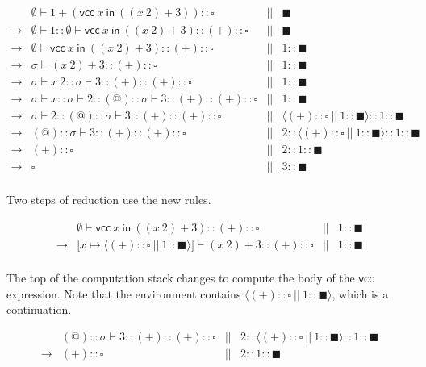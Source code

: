 \[
\begin{array}{lrcr}
& \emptyset\vdash 1+(\textsf{vcc}\ x\ \textsf{in}\ ((x\ 2)+3))::\square &||&
\blacksquare \\
\rightarrow & \emptyset\vdash 1::\emptyset\vdash \textsf{vcc}\ x\ \textsf{in}\
((x\ 2)+3)::(+)::\square &||& \blacksquare \\
\rightarrow & \emptyset\vdash \textsf{vcc}\ x\ \textsf{in}\ ((x\
2)+3)::(+)::\square &||& 1::\blacksquare \\
\rightarrow & \sigma\vdash (x\ 2)+3::(+)::\square &||& 1::\blacksquare \\
\rightarrow & \sigma\vdash x\ 2::\sigma\vdash 3::(+)::(+)::\square &||&
1::\blacksquare \\
\rightarrow & \sigma\vdash x::\sigma\vdash 2::(@)::\sigma\vdash
3::(+)::(+)::\square &||& 1::\blacksquare \\
\rightarrow & \sigma\vdash 2::(@)::\sigma\vdash 3::(+)::(+)::\square &||&
\langle(+)::\square \ ||\  1::\blacksquare\rangle:: 1::           \blacksquare \\
\rightarrow & (@)::\sigma\vdash 3::(+)::(+)::\square &||& 2::\langle(+)::\square
\ ||\  1::\blacksquare\rangle::1::           \blacksquare \\
\rightarrow & (+)::\square &||& 2::1::\blacksquare \\
\rightarrow & \square &||& 3::\blacksquare \\
\end{array}
\]

Two steps of reduction use the new rules.

\[\begin{array}{lrcr}
& \emptyset\vdash \textsf{vcc}\ x\ \textsf{in}\ ((x\ 2)+3)::(+)::\square &||&
1::\blacksquare \\
\rightarrow & \lbrack x\mapsto\langle(+)::\square\ ||\
1::\blacksquare\rangle\rbrack\vdash (x\ 2)+3::(+)::\square &||& 1::
\blacksquare \\
\end{array}\]

The top of the computation stack changes to compute the body of the
$\textsf{vcc}$ expression. Note that the environment contains
$\langle(+)::\square\ ||\ 1::\blacksquare\rangle$, which is a continuation.

\[\begin{array}{lrcr}
&(@)::\sigma\vdash 3::(+)::(+)::\square &||& 2::\langle(+)::\square \ ||\
1::\blacksquare\rangle::1::\blacksquare \\
\rightarrow & (+)::\square &||& 2::1::\blacksquare \\
\end{array}\]

